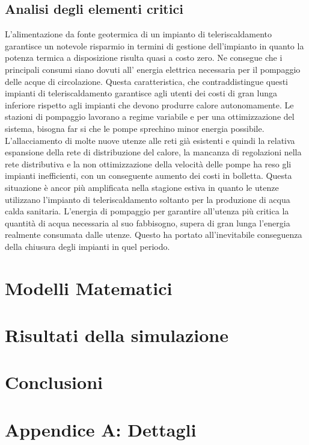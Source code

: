 \documentclass[laurea,oneside,11pt]{USiena_tesiLM}
\begin{document}
\section{Analisi degli elementi critici}
L'alimentazione da fonte geotermica di un impianto di teleriscaldamento garantisce un notevole risparmio in termini di gestione dell'impianto in quanto la potenza termica a disposizione risulta quasi a costo zero. Ne consegue che i principali consumi siano dovuti all' energia elettrica necessaria per il pompaggio delle acque di circolazione. Questa caratteristica,  che contraddistingue questi impianti di teleriscaldamento garantisce agli utenti dei costi di gran lunga inferiore rispetto agli impianti che devono produrre calore autonomamente. 
Le stazioni di pompaggio lavorano a regime variabile e per una ottimizzazione del sistema, bisogna far si che le pompe sprechino minor energia possibile. 
L'allacciamento di molte nuove utenze alle reti già esistenti e quindi la relativa  espansione della rete di distribuzione del calore, la mancanza di regolazioni nella rete distributiva e la non ottimizzazione della velocità delle pompe ha reso gli impianti inefficienti, con un conseguente aumento dei costi in bolletta. Questa situazione è ancor più amplificata nella stagione estiva in quanto le utenze utilizzano l'impianto di teleriscaldamento soltanto per la produzione di acqua calda sanitaria. L'energia di pompaggio per garantire all'utenza più critica la quantità di acqua necessaria al suo fabbisogno, supera di gran lunga l'energia realmente consumata dalle utenze. Questo ha portato all'inevitabile conseguenza della chiusura degli impianti in quel periodo.

\chapter{Modelli Matematici}

\chapter{Risultati della simulazione}

\chapter{Conclusioni}


\backmatter

\appendix
\chapter{Appendice A: Dettagli}
%


%



%

\end{document}
